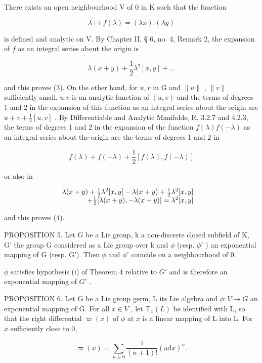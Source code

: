 There exists an open neighbourhood V of 0 in K such that the function

\[
\lambda \mapsto f (\lambda) = (\lambda x). (\lambda y)
\]

is defined and analytic on V. By Chapter II, § 6, no. 4, Remark 2, the expansion of \(f\) as an integral series about the origin is

\[
\lambda (x + y) + \frac {1}{2} \lambda^ {2} [ x, y ] + \dots
\]

and this proves (3). On the other hand, for \(u, v\) in G and \(\| u \|\) , \(\| v \|\) sufficiently small, \(u.v\) is an analytic function of \((u, v)\) and the terms of degrees 1 and 2 in the expansion of this function as an integral series about the origin are \(u + v + \frac{1}{4}[u, v]\) . By Differentiable and Analytic Manifolds, R, 3.2.7 and 4.2.3, the terms of degrees 1 and 2 in the expansion of the function \(f(\lambda)f(-\lambda)\) as an integral series about the origin are the terms of degrees 1 and 2 in

\[
f (\lambda) + f (- \lambda) + \frac {1}{2} [ f (\lambda), f (- \lambda) ]
\]

or also in

\[
\begin{array}{r l} \lambda (x + y) + \frac {1}{2} \lambda^ {2} [ x, y ] - \lambda (x + y) + \frac {1}{2} \lambda^ {2} [ x, y ] & \\ + \frac {1}{2} [ \lambda (x + y), - \lambda (x + y) ] = \lambda^ {2} [ x, y ] \end{array}
\]

and this proves (4).

PROPOSITION 5. Let G be a Lie group, k a non-discrete closed subfield of K, G' the group G considered as a Lie group over k and \(\phi\) (resp. \(\phi'\) ) an exponential mapping of G (resp. G'). Then \(\phi\) and \(\phi'\) coincide on a neighbourhood of 0.

\(\phi\) satisfies hypothesis (i) of Theorem 4 relative to \(G'\) and is therefore an exponential mapping of \(G'\) .

PROPOSITION 6. Let G be a Lie group germ, L its Lie algebra and \(\phi: V \to G\) an exponential mapping of G. For all \(x \in V\) , let \(\mathrm{T}_x(L)\) be identified with L, so that the right differential \(\varpi(x)\) of \(\phi\) at \(x\) is a linear mapping of L into L. For \(x\) sufficiently close to 0,

\[
\varpi (x) = \sum_ {n \geqslant 0} \frac {1}{(n + 1) !} (\mathrm{ad} x) ^ {n}.
\]

